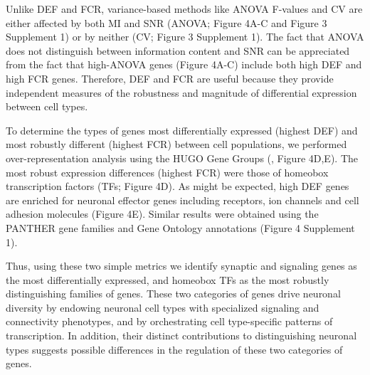 Unlike DEF and FCR, variance-based methods like ANOVA F-values and CV are either affected by both MI and SNR (ANOVA; Figure 4A-C and Figure 3 Supplement 1) or by neither (CV; Figure 3 Supplement 1). The fact that ANOVA does not distinguish between information content and SNR can be appreciated from the fact that high-ANOVA genes (Figure 4A-C) include both high DEF and high FCR genes. Therefore, DEF and FCR are useful because they provide independent measures of the robustness and magnitude of differential expression between cell types.

To determine the types of genes most differentially expressed (highest DEF) and most robustly different (highest FCR) between cell populations, we performed over-representation analysis using the HUGO Gene Groups (\citealt{Braschi_2018}, Figure 4D,E). The most robust expression differences (highest FCR) were those of homeobox transcription factors (TFs; Figure 4D). As might be expected, high DEF genes are enriched for neuronal effector genes including receptors, ion channels and cell adhesion molecules (Figure 4E). Similar results were obtained using the PANTHER gene families \citep{Mi_2016} and Gene Ontology annotations\cite{Ashburner_2000} (Figure 4 Supplement 1).  

Thus, using these two simple metrics we identify synaptic and signaling genes as the most differentially expressed, and homeobox TFs as the most robustly distinguishing families of genes. These two categories of genes drive neuronal diversity by endowing neuronal cell types with specialized signaling and connectivity phenotypes, and by orchestrating cell type-specific patterns of transcription. In addition, their distinct contributions to distinguishing neuronal types suggests possible differences in the regulation of these two categories of genes. 


